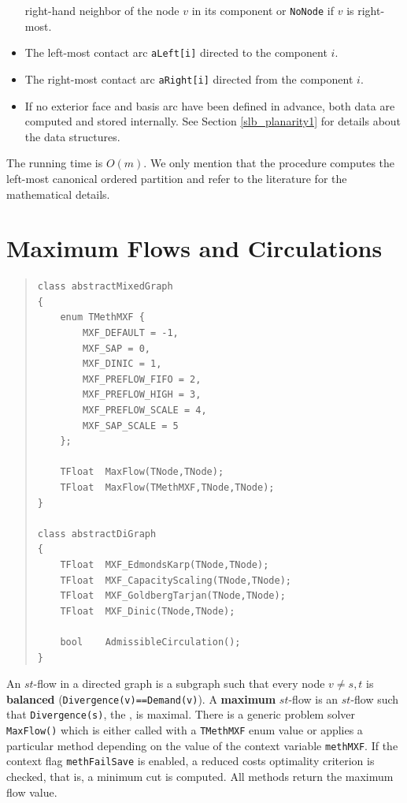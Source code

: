 \documentclass[a4paper,11pt,twoside]{book}
\begin{document}
\begin{multicols}{2}
\begin{itemize}
    right-hand neighbor of the node $v$ in its component or \verb/NoNode/ if
    $v$ is right-most.
\item The left-most contact arc \verb/aLeft[i]/ directed to the component $i$.
\item The right-most contact arc \verb/aRight[i]/ directed from the component
    $i$.
\item If no exterior face and basis arc have been defined in advance, both
    data are computed and stored internally. See Section \ref{slb_planarity1}
    for details about the data structures.
\end{itemize}
The running time is $O(m)$. We only mention that the procedure computes the
left-most canonical ordered partition and refer to the literature for the
mathematical details.



\section{Maximum Flows and Circulations}
\label{slb_solve_maxflow}
\methods
\begin{quote}
\begin{verbatim}
class abstractMixedGraph
{
    enum TMethMXF {
        MXF_DEFAULT = -1,
        MXF_SAP = 0,
        MXF_DINIC = 1,
        MXF_PREFLOW_FIFO = 2,
        MXF_PREFLOW_HIGH = 3,
        MXF_PREFLOW_SCALE = 4,
        MXF_SAP_SCALE = 5
    };

    TFloat  MaxFlow(TNode,TNode);
    TFloat  MaxFlow(TMethMXF,TNode,TNode);
}

class abstractDiGraph
{
    TFloat  MXF_EdmondsKarp(TNode,TNode);
    TFloat  MXF_CapacityScaling(TNode,TNode);
    TFloat  MXF_GoldbergTarjan(TNode,TNode);
    TFloat  MXF_Dinic(TNode,TNode);

    bool    AdmissibleCirculation();
}
\end{verbatim}
\end{quote}
An $st$-flow in a directed graph is a subgraph such that every node $v\neq s,t$
is {\bf balanced} (\verb/Divergence(v)==Demand(v)/).
A {\bf maximum} $st$-flow is an $st$-flow such that
\verb/Divergence(s)/, the , is maximal. There is a generic
problem solver \verb/MaxFlow()/ which is either called with a \verb/TMethMXF/
enum value or applies a particular method depending on the value of the context
variable \verb/methMXF/. If the context flag \verb/methFailSave/ is enabled,
a reduced costs optimality criterion is checked, that is, a minimum cut is
computed. All methods return the maximum flow value.


\end{multicols}
\end{document}
